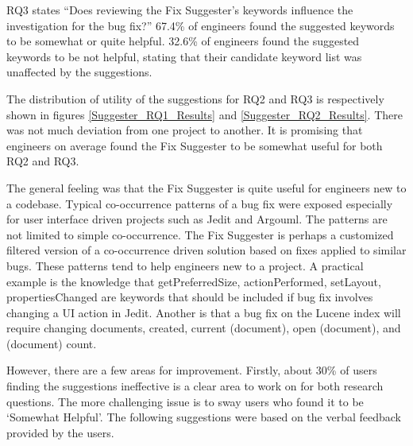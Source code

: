 \documentclass[conference]{IEEEtran}
\begin{document}
RQ3 states ``Does reviewing the Fix Suggester's keywords influence the investigation for the bug fix?'' 67.4\% of engineers found the suggested keywords to be somewhat or quite helpful. 32.6\% of engineers found the suggested keywords to be not helpful, stating that their candidate keyword list was unaffected by the suggestions.

The distribution of utility of the suggestions for RQ2 and RQ3 is respectively shown in figures \ref{Suggester_RQ1_Results} and \ref{Suggester_RQ2_Results}. There was not much deviation from one project to another. It is promising that engineers on average found the Fix Suggester to be somewhat useful for both RQ2 and RQ3.

The general feeling was that the Fix Suggester is quite useful for engineers new to a codebase. Typical co-occurrence patterns of a bug fix were exposed especially for user interface driven projects such as Jedit and Argouml. The patterns are not limited to simple co-occurrence. The Fix Suggester is perhaps a customized filtered version of a co-occurrence driven solution based on fixes applied to similar bugs. These patterns tend to help engineers new to a project. A practical example is the knowledge that getPreferredSize, actionPerformed, setLayout, propertiesChanged are keywords that should be included if bug fix involves changing a UI action in Jedit. Another is that a bug fix on the Lucene index will require changing documents, created, current (document), open (document), and (document) count.

However, there are a few areas for improvement. Firstly, about 30\% of users finding the suggestions ineffective is a clear area to work on for both research questions. The more challenging issue is to sway users who found it to be `Somewhat Helpful'. The following suggestions were based on the verbal feedback provided by the users. 
\end{document}
